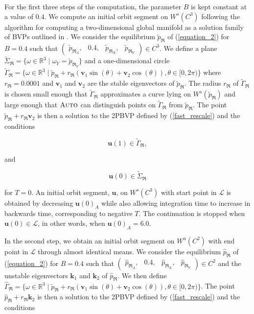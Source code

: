 \documentclass{ws-ijbc}
\begin{document}
For the first three steps of the computation, the parameter $B$ is kept constant at a value of $0.4$.  We compute an initial orbit segment on $W^{s}(C^3)$ following the algorithm for computing a two-dimensional global manifold as a solution family of BVPs outlined in \cite{Red_book}.  We consider the equilibrium $\tilde{p}_{\Re}$ of (\ref{equation_2}) for $B=0.4$ such that $\begin{pmatrix} \tilde{p}_{\Re_A},& 0.4,&\tilde{p}_{\Re_X},&\tilde{p}_{\Re_Y} \end{pmatrix} \in C^3$.  We define a plane $\widetilde{\Sigma}_{\Re} = \{ \omega \in \mathbb{R}^3  \; | \; \omega_Y = \tilde{p}_{\Re_Y} \}$ and a one-dimensional circle $\widetilde{\Gamma}_{\Re}= \{ \omega \in \mathbb{R}^3  \; | \; \tilde{p}_{\Re} + r_{\Re}(\mathbf{v}_1\sin(\theta) + \mathbf{v}_2\cos(\theta)), \theta \in [0,2\pi) \}$  where $r_{\Re}=0.0001$ and $\mathbf{v}_1$ and $\mathbf{v}_2$ are the stable eigenvectors of $\tilde{p}_{\Re}$.  The radius $r_{\Re}$ of $\widetilde{\Gamma}_{\Re}$ is chosen small enough that $\widetilde{\Gamma}_{\Re}$ approximates a curve lying on $W^{s}(\tilde{p}_{\Re})$ and large enough that $\textsc{Auto}$ can distinguish points on $\widetilde{\Gamma}_{\Re}$ from $\tilde{p}_{\Re}$.  The point $\tilde{p}_{\Re} + r_{\Re}\mathbf{v}_2$ is then a solution to the 2PBVP defined by (\ref{fast_rescale}) and the conditions

\begin{equation}
	\mathbf{u}(1) \in \widetilde{\Gamma}_{\Re},
	\label{top_end}
\end{equation}

and

\begin{equation}
	\mathbf{u}(0) \in \widetilde{\Sigma}_{\Re}
\end{equation}

\noindent
for $T=0$.  An initial orbit segment, $\mathbf{u}$, on $W^{s}(C^3)$ with start point in $\mathscr{L}$ is obtained by decreasing $\mathbf{u}(0)_A$ while also allowing integration time to increase in backwards time, corresponding to negative $T$.  The continuation is stopped when $\mathbf{u}(0) \in \mathscr{L}$, in other words, when $\mathbf{u}(0)_A = 6.0$.

In the second step, we obtain an initial orbit segment on $W^{u}(C^2)$ with end point in $\mathscr{L}$ through almost identical means.  We consider the equilibrium $\hat{p}_{\Re}$ of (\ref{equation_2}) for $B=0.4$ such that $\begin{pmatrix} \hat{p}_{\Re_A}, &0.4, & \hat{p}_{\Re_X}, & \hat{p}_{\Re_Y} \end{pmatrix} \in C^2$ and the unstable eigenvectors $\mathbf{k}_1$ and $\mathbf{k}_2$ of $\hat{p}_{\Re}$.  We then define $\widehat{\Gamma}_{\Re} = \{ \omega \in \mathbb{R}^3  \; | \; \tilde{p}_{\Re} + r_{\Re}(\mathbf{v}_1\sin(\theta) + \mathbf{v}_2\cos(\theta)), \theta \in [0,2\pi) \}$.  The point $\hat{p}_{\Re} + r_{\Re}\mathbf{k}_2$ is then a solution to the 2PBVP defined by (\ref{fast_rescale}) and the conditions
\end{document}
